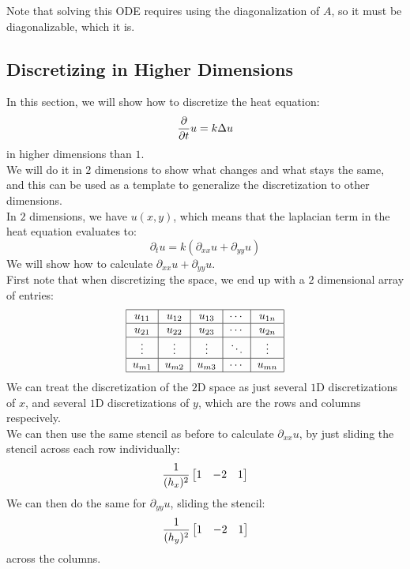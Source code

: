 \documentclass[12pt]{article}
\begin{document}
Note that solving this ODE requires
using the diagonalization of $A$, so it must
be diagonalizable, which it is. \\

\newpage

\subsection*{Discretizing in Higher Dimensions}

In this section, we will show how to
discretize the heat equation:
\[ \dfrac{\partial }{\partial t} u = k \Delta u \]
in higher dimensions than $1$. \\

We will do it in $2$ dimensions to show
what changes and what stays the same, and this
can be used as a template to generalize the
discretization to other dimensions. \\

In $2$ dimensions, we have $u(x, y)$,
which means that the laplacian term in the
heat equation evaluates to:
\[ \partial_t u = 
k (\partial_{xx}u + \partial_{yy}u) \]
We will show how to calculate 
$\partial_{xx}u + \partial_{yy}u$. \\

First note that when discretizing the space,
we end up with a $2$ dimensional array of entries:
\[ \begin{tabular}{|c|c|c|c|c|}
\hline
$u_{11}$ & $u_{12}$ & $u_{13}$ & $\cdots$ & $u_{1n}$ \\
\hline
$u_{21}$ & $u_{22}$ & $u_{23}$ & $\cdots$ & $u_{2n}$ \\
\hline
$\vdots$ & $\vdots$ & $\vdots$ & $\ddots$ & $\vdots$ \\
\hline
$u_{m1}$ & $u_{m2}$ & $u_{m3}$ & $\cdots$ & $u_{mn}$ \\
\hline \end{tabular} \]
We can treat the discretization
of the $2$D space as just several $1$D
discretizations of $x$,
and several $1$D discretizations of $y$,
which are the rows and columns respecively. \\

We can then use the same stencil as before
to calculate $\partial_{xx} u$,
by just sliding the stencil across each row
individually:
\[ \dfrac{1}{(h_x)^2}\begin{bmatrix} 1 & -2 & 1 \end{bmatrix} \]
We can then do the same for $\partial_{yy} u$,
sliding the stencil:
\[ \dfrac{1}{(h_y)^2}\begin{bmatrix} 1 & -2 & 1 \end{bmatrix} \]
across the columns. \\
\end{document}
